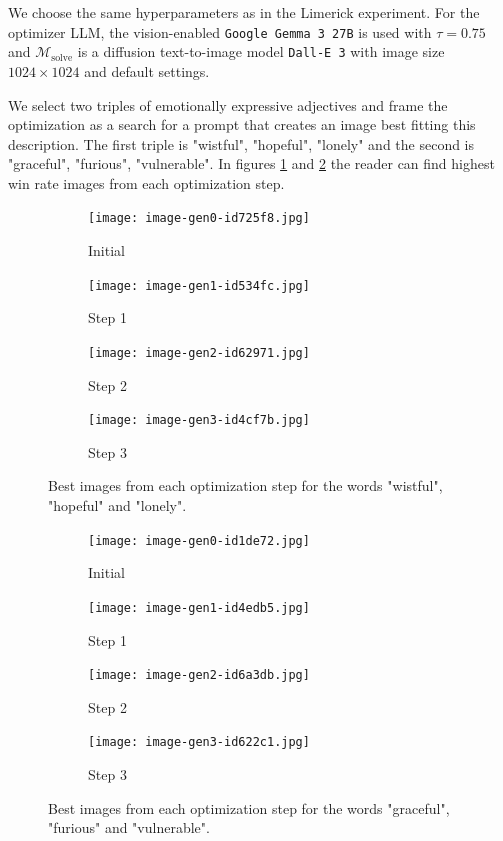 We choose the same hyperparameters as in the Limerick experiment. For the optimizer LLM, the vision-enabled \texttt{Google Gemma 3 27B} is used with $\tau = 0.75$ and 
$\mathcal{M}_{\text{solve}}$ is a diffusion text-to-image model \texttt{Dall-E 3} with image size $1024\times1024$ and default settings.

We select two triples of emotionally expressive adjectives and frame the optimization as a search for a prompt that creates an image best fitting this description. 
The first triple is "wistful", "hopeful", "lonely" and the second is "graceful", "furious", "vulnerable". In figures \ref{fig:wistful} and \ref{fig:graceful} the reader can find
highest win rate images from each optimization step.


\begin{figure}[htbp]
    \centering

    \begin{subfigure}{0.24\linewidth}
        \texttt{[image: image-gen0-id725f8.jpg]}
        \caption{Initial}
    \end{subfigure}
    \hfill
    \begin{subfigure}{0.24\linewidth}
        \texttt{[image: image-gen1-id534fc.jpg]}
        \caption{Step 1}
    \end{subfigure}
    \hfill
    \begin{subfigure}{0.24\linewidth}
        \texttt{[image: image-gen2-id62971.jpg]}
        \caption{Step 2}
    \end{subfigure}
    \hfill
    \begin{subfigure}{0.24\linewidth}
        \texttt{[image: image-gen3-id4cf7b.jpg]}
        \caption{Step 3}
    \end{subfigure}

    \caption{Best images from each optimization step for the words "wistful", "hopeful" and "lonely".}
    \label{fig:wistful}
\end{figure}

\begin{figure}[htbp]
    \centering

    \begin{subfigure}{0.24\linewidth}
        \texttt{[image: image-gen0-id1de72.jpg]}
        \caption{Initial}
    \end{subfigure}
    \hfill
    \begin{subfigure}{0.24\linewidth}
        \texttt{[image: image-gen1-id4edb5.jpg]}
        \caption{Step 1}
    \end{subfigure}
    \hfill
    \begin{subfigure}{0.24\linewidth}
        \texttt{[image: image-gen2-id6a3db.jpg]}
        \caption{Step 2}
    \end{subfigure}
    \hfill
    \begin{subfigure}{0.24\linewidth}
        \texttt{[image: image-gen3-id622c1.jpg]}
        \caption{Step 3}
    \end{subfigure}

    \caption{Best images from each optimization step for the words "graceful", "furious" and "vulnerable".}
    \label{fig:graceful}
\end{figure}

